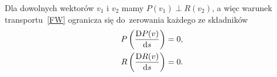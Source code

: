 Dla dowolnych wektorów $v_1$ i $v_2$ mamy $P(v_1)\perp R(v_2)$,
a więc warunek transportu~\eqref{FW} ogranicza się 
do~zerowania każdego ze składników
\begin{align*}
P \left(\frac{\text{D} P(v)}{\text{d} s} \right)  = 0 ,\\
R \left( \frac{\text{D} R(v)}{\text{d} s} \right) = 0.
\end{align*}




